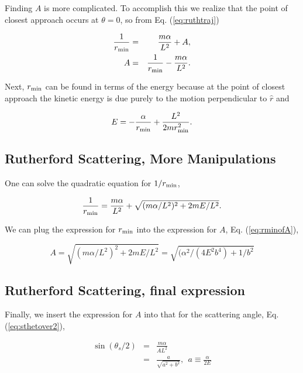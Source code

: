\documentclass[%
oneside,                 %
final,                   %
10pt]{article}
\begin{document}
Finding $A$ is more complicated. To accomplish this we realize that
the point of closest approach occurs at $\theta=0$, so from
Eq. (\ref{eq:ruthtraj})

\begin{eqnarray}
\label{eq:rminofA}
\frac{1}{r_{\rm min}}&=&\frac{m\alpha}{L^2}+A,\\
\nonumber
A&=&\frac{1}{r_{\rm min}}-\frac{m\alpha}{L^2}.
\end{eqnarray}

Next, $r_{\rm min}$ can be found in terms of the energy because at the
point of closest approach the kinetic energy is due purely to the
motion perpendicular to $\hat{r}$ and

\begin{equation}
E=-\frac{\alpha}{r_{\rm min}}+\frac{L^2}{2mr_{\rm min}^2}.
\end{equation}

\subsection{Rutherford Scattering, More Manipulations}

One can solve the quadratic equation for $1/r_{\rm min}$,

\begin{equation}
\frac{1}{r_{\rm min}}=\frac{m\alpha}{L^2}+\sqrt{(m\alpha/L^2)^2+2mE/L^2}.
\end{equation}

We can plug the expression for $r_{\rm min}$ into the expression for $A$, Eq. (\ref{eq:rminofA}),

\begin{equation}
A=\sqrt{(m\alpha/L^2)^2+2mE/L^2}=\sqrt{(\alpha^2/(4E^2b^4)+1/b^2}
\end{equation}

\subsection{Rutherford Scattering, final expression}

Finally, we insert the expression for $A$ into that for the scattering angle, Eq. (\ref{eq:sthetover2}),

\begin{eqnarray}
\label{eq:scattangle}
\sin(\theta_s/2)&=&\frac{m\alpha}{AL^2}\\
\nonumber
&=&\frac{a}{\sqrt{a^2+b^2}}, ~~a\equiv \frac{\alpha}{2E}
\end{eqnarray}
\end{document}
